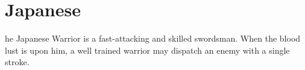 
\clearpage

\section{\textsf{Japanese}}



he Japanese Warrior is a fast-attacking and skilled swordsman. When the blood lust is upon him, a well trained warrior may dispatch an enemy with a single stroke.

